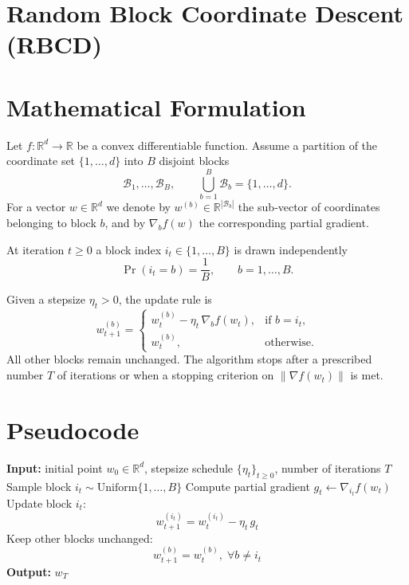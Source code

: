 \documentclass{article}
\newcommand{\R}{\mathbb{R}}
\begin{document}
\section*{Random Block Coordinate Descent (RBCD)}

\section*{Mathematical Formulation}
Let $f:\R^{d}\rightarrow\R$ be a convex differentiable function.  
Assume a partition of the coordinate set $\{1,\dots ,d\}$ into $B$ disjoint blocks
\[
\mathcal{B}_{1},\dots ,\mathcal{B}_{B},\qquad 
\bigcup_{b=1}^{B}\mathcal{B}_{b}=\{1,\dots ,d\}.
\]
For a vector $w\in\R^{d}$ we denote by $w^{(b)}\in\R^{|\mathcal{B}_{b}|}$ the sub‑vector of coordinates belonging to block $b$, and by $\nabla_{b}f(w)$ the corresponding partial gradient.

At iteration $t\ge 0$ a block index $i_{t}\in\{1,\dots ,B\}$ is drawn independently
\[
\Pr(i_{t}=b)=\frac{1}{B},\qquad b=1,\dots ,B .
\]

Given a stepsize $\eta_{t}>0$, the update rule is
\[
\boxed{
w_{t+1}^{(b)}=
\begin{cases}
w_{t}^{(b)}-\eta_{t}\,\nabla_{b}f(w_{t}), &\text{if }b=i_{t},\\[4pt]
w_{t}^{(b)}, &\text{otherwise.}
\end{cases}}
\tag{1}
\]
All other blocks remain unchanged.  The algorithm stops after a prescribed
number $T$ of iterations or when a stopping criterion on $\| \nabla f(w_{t})\|$ is met.

\section*{Pseudocode}
\begin{algorithm}[H]
\caption{Random Block Coordinate Descent}
\begin{algorithmic}[1]
\State \textbf{Input:} initial point $w_{0}\in\R^{d}$, stepsize schedule $\{\eta_{t}\}_{t\ge0}$, number of iterations $T$
    \State Sample block $i_{t}\sim\mathrm{Uniform}\{1,\dots ,B\}$
    \State Compute partial gradient $\displaystyle g_{t}\gets \nabla_{i_{t}}f(w_{t})$
    \State Update block $i_{t}$:
    \[
    w_{t+1}^{(i_{t})}=w_{t}^{(i_{t})}-\eta_{t}\,g_{t}
    \]
    \State Keep other blocks unchanged:
    \[
    w_{t+1}^{(b)}=w_{t}^{(b)},\;\forall b\neq i_{t}
    \]
\EndFor
\State \textbf{Output:} $w_{T}$
\end{algorithmic}
\end{algorithm}
\end{document}
